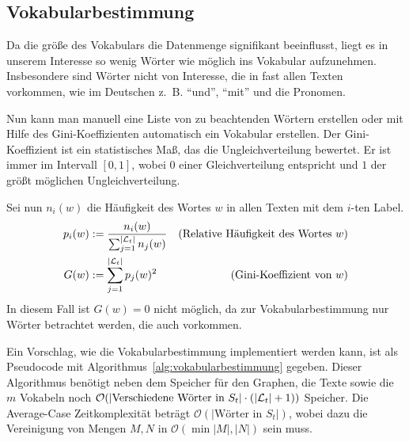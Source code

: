 \subsection{Vokabularbestimmung}\label{sec:vokabularbestimmung}
Da die größe des Vokabulars die Datenmenge signifikant beeinflusst,
liegt es in unserem Interesse so wenig Wörter wie möglich ins
Vokabular aufzunehmen. Insbesondere sind Wörter nicht von Interesse,
die in fast allen Texten vorkommen, wie im Deutschen z.~B.
\enquote{und}, \enquote{mit} und die Pronomen.

Nun kann man manuell eine Liste von zu beachtenden Wörtern erstellen
oder mit Hilfe des Gini-Koeffizienten automatisch ein Vokabular erstellen.
Der Gini-Koeffizient ist ein statistisches Maß, das die Ungleichverteilung
bewertet. Er ist immer im Intervall $[0,1]$, wobei $0$ einer 
Gleichverteilung entspricht und $1$ der größt möglichen Ungleichverteilung.

Sei nun $n_i(w)$ die Häufigkeit des Wortes $w$ in allen Texten mit 
dem $i$-ten Label.
\begin{align}
    p_i(w) &:= \frac{n_i(w)}{\sum_{j=1}^{|\mathcal{L}_t|} n_j(w)} &\text{(Relative Häufigkeit des Wortes $w$)}\\
    G(w)   &:= \sum_{j=1}^{|\mathcal{L}_t|} p_j(w)^2              &\text{(Gini-Koeffizient von $w$)}
\end{align}
In diesem Fall ist $G(w)=0$ nicht möglich, da zur Vokabularbestimmung
nur Wörter betrachtet werden, die auch vorkommen.

Ein Vorschlag, wie die Vokabularbestimmung implementiert werden kann,
ist als Pseudocode mit Algorithmus~\ref{alg:vokabularbestimmung}
gegeben. Dieser Algorithmus benötigt neben dem Speicher für den
Graphen, die Texte sowie die $m$ Vokabeln noch $\mathcal{O}(|\text{Verschiedene Wörter in } S_t| \cdot (|\mathcal{L}_t| + 1))$
Speicher. Die Average-Case Zeitkomplexität beträgt 
$\mathcal{O}(|\text{Wörter in } S_t|)$, wobei dazu die Vereinigung
von Mengen $M,N$ in $\mathcal{O}(\min{|M|, |N|})$ sein muss.

